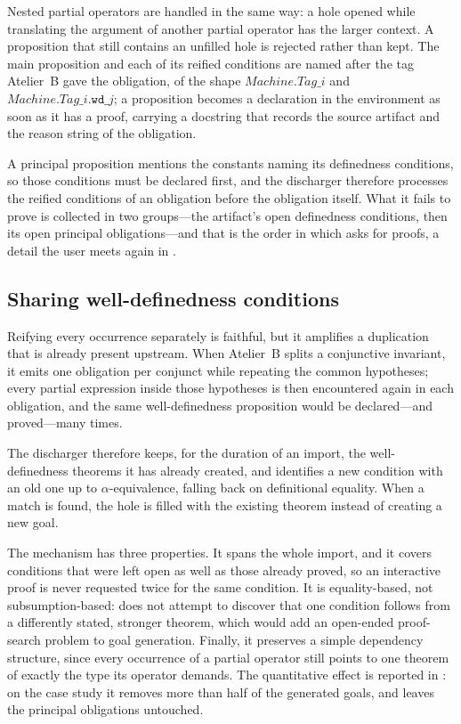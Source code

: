 \FloatBarrier

Nested partial operators are handled in the same way: a hole opened while translating the
argument of another partial operator has the larger context.
A proposition that still contains an unfilled hole is rejected rather than kept.
The main proposition and each of its reified conditions are named after the tag Atelier~B
gave the obligation, of the shape \(\mathit{Machine}.\mathit{Tag}\_i\) and
\(\mathit{Machine}.\mathit{Tag}\_i.\mathtt{wd}\_j\); a proposition becomes a declaration in
the environment as soon as it has a proof, carrying a docstring that records the source
artifact and the reason string of the obligation.

A principal proposition mentions the constants naming its definedness conditions, so those
conditions must be declared first, and the discharger therefore processes the reified
conditions of an obligation before the obligation itself.
What it fails to prove is collected in two groups---the artifact's open definedness
conditions, then its open principal obligations---and that is the order in which
 asks for proofs, a detail the user meets again in
.

\subsection{Sharing well-definedness conditions}
\label{subsec:barrel-wd-sharing}

Reifying every occurrence separately is faithful, but it amplifies a duplication that is
already present upstream.
When Atelier~B splits a conjunctive invariant, it emits one obligation per conjunct while
repeating the common hypotheses; every partial expression inside those hypotheses is then
encountered again in each obligation, and the same well-definedness proposition would be
declared---and proved---many times.

The discharger therefore keeps, for the duration of an import, the well-definedness
theorems it has already created, and identifies a new condition with an old one up to
\(\alpha\)-equivalence, falling back on definitional equality.
When a match is found, the hole is filled with the existing theorem instead of creating a
new goal.

The mechanism has three properties.
It spans the whole import, and it covers conditions that were left open as well as those
already proved, so an interactive proof is never requested twice for the same condition.
It is equality-based, not subsumption-based: \barrel{} does not attempt to discover that
one condition follows from a differently stated, stronger theorem, which would add an
open-ended proof-search problem to goal generation.
Finally, it preserves a simple dependency structure, since every occurrence of a partial
operator still points to one theorem of exactly the type its operator demands.
The quantitative effect is reported in : on the case
study it removes more than half of the generated goals, and leaves the principal
obligations untouched.


